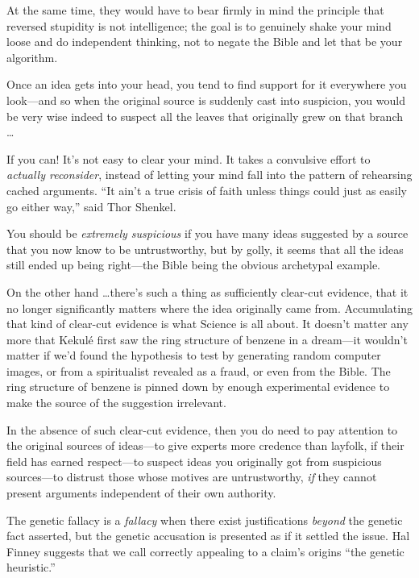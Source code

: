 {
 At the same time, they would have to bear firmly in mind the
principle that reversed stupidity is not intelligence; the goal is to
genuinely shake your mind loose and do independent thinking, not to
negate the Bible and let that be your algorithm.}

{
 Once an idea gets into your head, you tend to find support for it
everywhere you look---and so when the original source is suddenly cast
into suspicion, you would be very wise indeed to suspect all the leaves
that originally grew on that branch \ldots}

{
 If you can! It's not easy to clear your mind. It
takes a convulsive effort to \textit{actually reconsider}, instead of
letting your mind fall into the pattern of rehearsing cached arguments.
``It ain't a true crisis of faith
unless things could just as easily go either way,''
said Thor Shenkel.}

{
 You should be \textit{extremely suspicious} if you have many ideas
suggested by a source that you now know to be untrustworthy, but by
golly, it seems that all the ideas still ended up being right---the
Bible being the obvious archetypal example.}

{
 On the other hand \ldots there's such a thing as
sufficiently clear-cut evidence, that it no longer significantly
matters where the idea originally came from. Accumulating that kind of
clear-cut evidence is what Science is all about. It
doesn't matter any more that Kekulé first saw the ring
structure of benzene in a dream---it wouldn't matter if
we'd found the hypothesis to test by generating random
computer images, or from a spiritualist revealed as a fraud, or even
from the Bible. The ring structure of benzene is pinned down by enough
experimental evidence to make the source of the suggestion irrelevant.}

{
 In the absence of such clear-cut evidence, then you do need to pay
attention to the original sources of ideas---to give experts more
credence than layfolk, if their field has earned respect---to suspect
ideas you originally got from suspicious sources---to distrust those
whose motives are untrustworthy, \textit{if} they cannot present
arguments independent of their own authority.}

{
 The genetic fallacy is a \textit{fallacy} when there exist
justifications \textit{beyond} the genetic fact asserted, but the
genetic accusation is presented as if it settled the issue. Hal Finney
suggests that we call correctly appealing to a claim's
origins ``the genetic heuristic.''}

